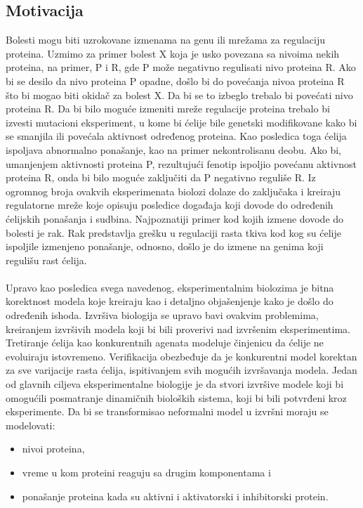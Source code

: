 \documentclass[a4paper]{article}
\begin{document}
\subsection{Motivacija}
Bolesti mogu biti uzrokovane izmenama na genu ili mrežama za regulaciju proteina. Uzmimo za primer bolest X koja je usko povezana sa nivoima nekih proteina, na primer, P i R, gde P može negativno regulisati nivo proteina R. Ako bi se desilo da nivo proteina P opadne, došlo bi do povećanja nivoa proteina R što bi mogao biti okidač za bolest X. Da bi se to izbeglo trebalo bi povećati nivo proteina R. Da bi bilo moguće izmeniti mreže regulacije proteina trebalo bi izvesti mutacioni eksperiment, u kome bi ćelije bile genetski modifikovane kako bi se smanjila ili povećala aktivnost određenog proteina. Kao posledica toga ćelija ispoljava abnormalno ponašanje, kao na primer nekontrolisanu deobu. Ako bi, umanjenjem aktivnosti proteina P, rezultujući fenotip ispoljio povećanu aktivnost proteina R, onda bi bilo moguće zaključiti da P negativno reguliše R. Iz ogromnog broja ovakvih eksperimenata biolozi dolaze do zaključaka i kreiraju regulatorne mreže koje opisuju posledice događaja koji dovode do određenih ćelijskih ponašanja i sudbina. Najpoznatiji primer kod kojih izmene dovode do bolesti je rak. Rak predstavlja grešku u regulaciji rasta tkiva kod kog su ćelije ispoljile izmenjeno ponašanje, odnosno, došlo je do izmene na genima koji regulišu rast ćelija.\\\\

Upravo kao posledica svega navedenog, eksperimentalnim biolozima je bitna korektnost modela koje kreiraju kao i detaljno objašenjenje kako je došlo do određenih ishoda. Izvršiva biologija se upravo bavi ovakvim problemima, kreiranjem izvršivih modela koji bi bili proverivi nad izvršenim eksperimentima. Tretiranje ćelija kao konkurentnih agenata modeluje činjenicu da ćelije ne evoluiraju istovremeno. Verifikacija obezbeđuje da je konkurentni model korektan za sve varijacije rasta ćelija, ispitivanjem svih mogućih izvršavanja modela.
Jedan od glavnih ciljeva eksperimentalne biologije je da stvori izvršive modele koji bi omogućili posmatranje dinamičnih bioloških sistema, koji bi bili potvrđeni kroz eksperimente. Da bi se transformisao neformalni model u izvršni moraju se modelovati:
\begin{itemize}
\item nivoi proteina,
\item vreme u kom proteini reaguju sa drugim komponentama i
\item ponašanje proteina kada su aktivni i aktivatorski i inhibitorski protein.
\end{itemize}
\end{document}

